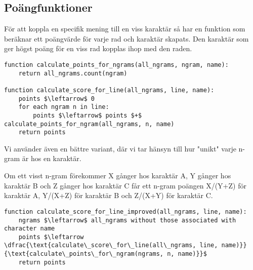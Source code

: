 \documentclass[a4paper]{article}
\begin{document}
\subsection{Poängfunktioner}
För att koppla en specifik mening till en viss karaktär så har en funktion som
beräknar ett poängvärde för varje rad och karaktär skapats. Den karaktär som ger
högst poäng för en viss rad kopplas ihop med den raden.

\begin{lstlisting}[mathescape, columns=fullflexible, basicstyle=\fontfamily{lmvtt}\selectfont]
function calculate_points_for_ngrams(all_ngrams, ngram, name):
    return all_ngrams.count(ngram)

function calculate_score_for_line(all_ngrams, line, name):
    points $\leftarrow$ 0
    for each ngram n in line:
        points $\leftarrow$ points $+$ calculate_points_for_ngram(all_ngrams, n, name)
    return points
\end{lstlisting}

Vi använder även en bättre variant, där vi tar hänsyn till hur "unikt" varje
n-gram är hos en karaktär.

Om ett visst n-gram förekommer X gånger hos karaktär A, Y gånger hos karaktär B
och Z gånger hos karaktär C får ett n-gram poängen X/(Y+Z) för karaktär A,
Y/(X+Z) för karaktär B och Z/(X+Y) för karaktär C.

\begin{lstlisting}[mathescape, columns=fullflexible, basicstyle=\fontfamily{lmvtt}\selectfont]
function calculate_score_for_line_improved(all_ngrams, line, name):
    ngrams $\leftarrow$ all_ngrams without those associated with character name 
    points $\leftarrow  \dfrac{\text{calculate\_score\_for\_line(all\_ngrams, line, name)}}{\text{calculate\_points\_for\_ngram(ngrams, n, name)}}$
    return points
\end{lstlisting}
\end{document}
